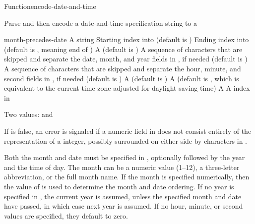 \documentclass[10pt,twoside,english,pdftex]{article}
\begin{document}
\begin{functiondoc}{Function}{encode-date-and-time}{%
     
    }
% 

\fnsyntax

\fnpurpose Parse and then encode a date-and-time specification string to a

\fnpackage {} 

\fnmodule {}

\fnargs
\begin{args}{month-precedes-date}
\arg[string] A string
\arg[start] Starting index into  (default is )
\arg[end] Ending index into  (default is \nil, meaning
end of )
 A  (default is \nil)
 A sequence of characters that are skipped and separate the
 date, month, and year fields in , if needed (default is 
 )
 A sequence of characters that are skipped and separate the
 hour, minute, and second fields in , if needed (default is 
 )
 A  (default is 
)
 A  (default is \nil,
  which is equivalent to the current time zone adjusted for daylight
  saving time)
 A  
\arg[position] A index in 
\end{args}

\fnreturns Two values:  and 

\fnerrors
%
If  is false, an error is signaled if a numeric field in
 does not consist entirely of the representation of a integer,
possibly surrounded on either side by characters in .

\fndescription
%
Both the month and date must be specified in , optionally followed
by the year and the time of day. The month can be a numeric value (1--12), a
three-letter abbreviation, or the full month name.  If the month is specified
numerically, then the value of  is used to
determine the month and date ordering. If no year is specified in
, the current year is assumed, unless the specified month and date
have passed, in which case next year is assumed.  If no hour, minute, or
second values are specified, they default to zero.  


\end{functiondoc}
\end{document}
